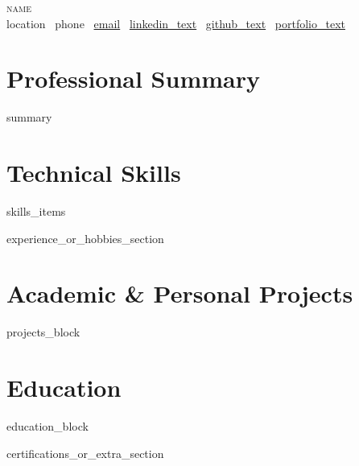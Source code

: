


\begin{center}
    {\Huge \scshape {{name}}} \\[6pt]
    \small
    {{location}} \quad
    \faPhone~{{phone}} \quad
    \faEnvelope~\href{mailto:{{email}}}{{email}} \quad
    \faLinkedin~\href{{{linkedin_url}}}{{linkedin_text}} \quad
    \faGithub~\href{{{github_url}}}{{github_text}} \quad
    \faGlobe~\href{{{portfolio_url}}}{{portfolio_text}}
\end{center}

\section{Professional Summary}
\small{
{{summary}}
}

\section{Technical Skills}
\begin{itemize}[leftmargin=0.15in, label={}]
\small{
{{skills_items}}
}
\end{itemize}

{{experience_or_hobbies_section}}

\section{Academic \& Personal Projects}
\resumeSubHeadingListStart

{{projects_block}}

\resumeSubHeadingListEnd

\section{Education}
\resumeSubHeadingListStart

{{education_block}}

\resumeSubHeadingListEnd

{{certifications_or_extra_section}}

